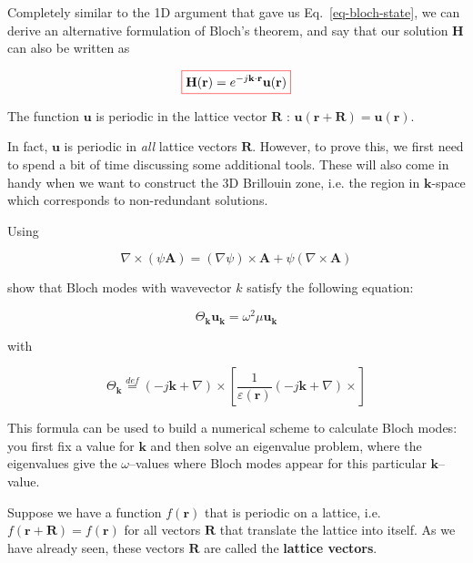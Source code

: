 Completely similar to the 1D argument that gave us Eq.~\ref{eq-bloch-state}, we can derive an alternative formulation of Bloch's theorem, and say that our solution ${\mathbf H}$ can also be written as

\begin{equation}
\fbox{$\displaystyle
{\mathbf H} ({\mathbf r}) = e^{-j {\mathbf k} \cdot {\mathbf r}} {\mathbf u} ({\mathbf r})
$}
\end{equation} 

The function ${\mathbf u}$ is periodic in the lattice vector ${\mathbf R}$ : ${\mathbf u} ({\mathbf r} + {\mathbf R})  = {\mathbf u} ({\mathbf r})$.

In fact, ${\mathbf u}$ is periodic in \emph{all} lattice vectors ${\mathbf R}$. However, to prove this, we first need to spend a bit of time discussing some additional tools. These will also come in handy when we want to construct the 3D Brillouin zone, i.e. the region in ${\mathbf k}$-space which corresponds to non-redundant solutions.

\pagebreak

\begin{exer}

Using

$$ \nabla \times (\psi {\mathbf A}) = (\nabla \psi) \times {\mathbf A} + \psi (\nabla \times {\mathbf A}) $$
  
show that Bloch modes with wavevector $k$ satisfy the following equation:

$$\Theta_{\mathbf k} {\mathbf u}_{\mathbf k} = \omega^2 \mu {\mathbf u}_{\mathbf k}$$

with

$$\Theta_{\mathbf k} \stackrel{def}{=} (-j {\mathbf k} + \nabla) \times \left [ \frac{1}{\varepsilon({\mathbf r})}(-j{\mathbf k} +\nabla) \times \right ]$$

This formula can be used to build a numerical scheme to calculate Bloch modes: you first fix a value for ${\mathbf k}$ and then solve an eigenvalue problem, where the eigenvalues give the $\omega$--values where Bloch modes appear for this particular ${\mathbf k}$--value.

\end{exer}



\pagebreak


Suppose we have a function $f({\mathbf r})$ that is periodic on a lattice, i.e. $f({\mathbf r} + {\mathbf R}) = f({\mathbf r})$ for all vectors ${\mathbf R}$ that translate the lattice into itself. As we have already seen, these vectors ${\mathbf R}$ are called the \textbf{lattice vectors}.

